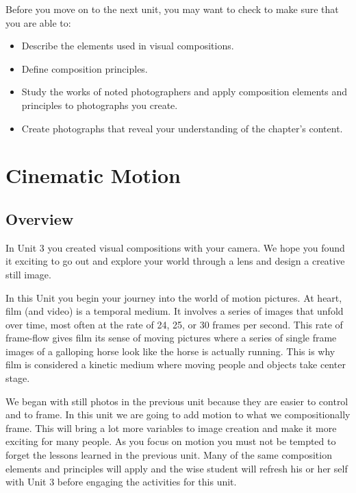 \documentclass[
]{book}
\providecommand{\tightlist}{%
  \setlength{\itemsep}{0pt}\setlength{\parskip}{0pt}}
\begin{document}
\begin{progress}
Before you move on to the next unit, you may want to check to make sure that you are able to:

\begin{itemize}
\tightlist
\item
  Describe the elements used in visual compositions.
\item
  Define composition principles.
\item
  Study the works of noted photographers and apply composition elements and principles to photographs you create.
\item
  Create photographs that reveal your understanding of the chapter's content.
\end{itemize}
\end{progress}

\hypertarget{cinematic-motion}{%
\chapter{Cinematic Motion}\label{cinematic-motion}}

\hypertarget{overview-3}{%
\section*{Overview}\label{overview-3}}

In Unit 3 you created visual compositions with your camera. We hope you found it exciting to go out and explore your world through a lens and design a creative still image.

In this Unit you begin your journey into the world of motion pictures. At heart, film (and video) is a temporal medium. It involves a series of images that unfold over time, most often at the rate of 24, 25, or 30 frames per second. This rate of frame-flow gives film its sense of moving pictures where a series of single frame images of a galloping horse look like the horse is actually running. This is why film is considered a kinetic medium where moving people and objects take center stage.

We began with still photos in the previous unit because they are easier to control and to frame. In this unit we are going to add motion to what we compositionally frame. This will bring a lot more variables to image creation and make it more exciting for many people. As you focus on motion you must not be tempted to forget the lessons learned in the previous unit. Many of the same composition elements and principles will apply and the wise student will refresh his or her self with Unit 3 before engaging the activities for this unit.
\end{document}
